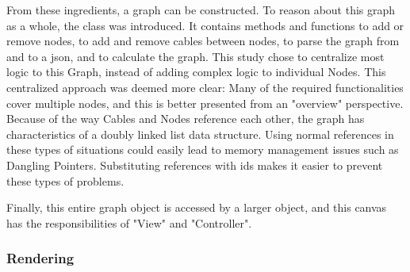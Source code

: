 From these ingredients, a graph can be constructed. 
To reason about this graph as a whole, the  class was introduced. 
It contains methods and functions to add or remove nodes, to add and remove cables between nodes, to parse the graph from and to a json, and to calculate the graph.  
This study chose to centralize most logic to this Graph, instead of adding complex logic to individual Nodes. 
This centralized approach was deemed more clear: Many of the required functionalities cover multiple nodes, and this is better presented from an "overview" perspective.
Because of the way Cables and Nodes reference each other, the graph has characteristics of a doubly linked list data structure. 
Using normal references in these types of situations could easily lead to memory management issues such as Dangling Pointers. 
Substituting references with ids makes it easier to prevent these types of problems. 

Finally, this entire graph object is accessed by a larger  object, and this canvas has the responsibilities of "View" and "Controller". 

\subsubsection*{Rendering}

